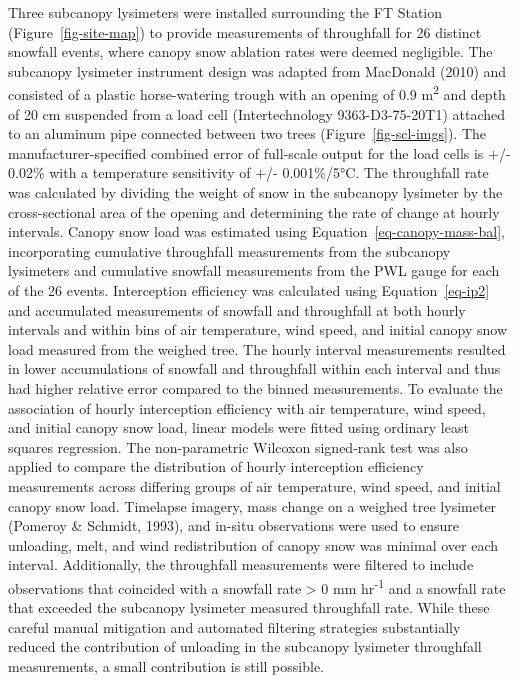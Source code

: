 \documentclass[
  letterpaper,
]{tex/uofsthesis-cs}
\begin{document}
Three subcanopy lysimeters were installed surrounding the FT Station
(Figure~\ref{fig-site-map}) to provide measurements of throughfall for
26 distinct snowfall events, where canopy snow ablation rates were
deemed negligible. The subcanopy lysimeter instrument design was adapted
from MacDonald (2010) and consisted of a plastic horse-watering trough
with an opening of 0.9 m\textsuperscript{2} and depth of 20 cm suspended
from a load cell (Intertechnology 9363-D3-75-20T1) attached to an
aluminum pipe connected between two trees (Figure~\ref{fig-scl-imgs}).
The manufacturer-specified combined error of full-scale output for the
load cells is +/- 0.02\% with a temperature sensitivity of +/-
0.001\%/5°C. The throughfall rate was calculated by dividing the weight
of snow in the subcanopy lysimeter by the cross-sectional area of the
opening and determining the rate of change at hourly intervals. Canopy
snow load was estimated using Equation~\ref{eq-canopy-mass-bal},
incorporating cumulative throughfall measurements from the subcanopy
lysimeters and cumulative snowfall measurements from the PWL gauge for
each of the 26 events. Interception efficiency was calculated using
Equation~\ref{eq-ip2} and accumulated measurements of snowfall and
throughfall at both hourly intervals and within bins of air temperature,
wind speed, and initial canopy snow load measured from the weighed tree.
The hourly interval measurements resulted in lower accumulations of
snowfall and throughfall within each interval and thus had higher
relative error compared to the binned measurements. To evaluate the
association of hourly interception efficiency with air temperature, wind
speed, and initial canopy snow load, linear models were fitted using
ordinary least squares regression. The non-parametric Wilcoxon
signed-rank test was also applied to compare the distribution of hourly
interception efficiency measurements across differing groups of air
temperature, wind speed, and initial canopy snow load. Timelapse
imagery, mass change on a weighed tree lysimeter (Pomeroy \& Schmidt,
1993), and in-situ observations were used to ensure unloading, melt, and
wind redistribution of canopy snow was minimal over each interval.
Additionally, the throughfall measurements were filtered to include
observations that coincided with a snowfall rate \textgreater{} 0 mm
hr\textsuperscript{-1} and a snowfall rate that exceeded the subcanopy
lysimeter measured throughfall rate. While these careful manual
mitigation and automated filtering strategies substantially reduced the
contribution of unloading in the subcanopy lysimeter throughfall
measurements, a small contribution is still possible.
\end{document}
